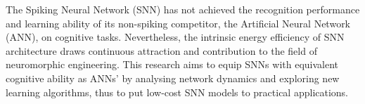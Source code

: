 % 
%
%

The Spiking Neural Network (SNN) has not achieved the recognition performance and learning ability of its non-spiking competitor, the Artificial Neural Network (ANN), on cognitive tasks.
Nevertheless, the intrinsic energy efficiency of SNN architecture draws continuous attraction and contribution to the field of neuromorphic engineering.
This research aims to equip SNNs with equivalent cognitive ability as ANNs' by analysing network dynamics and exploring new learning algorithms, thus to put low-cost SNN models to practical applications.


